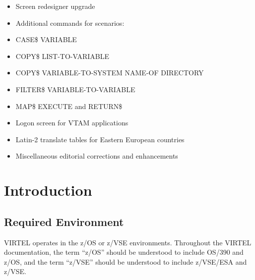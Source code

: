 \documentclass[letterpaper,10pt,english]{sphinxmanual}
\begin{document}
\begin{itemize}
\item {} 
Screen redesigner upgrade

\item {} 
Additional commands for scenarios:

\item {} 
CASE\$ VARIABLE

\item {} 
COPY\$ LIST-TO-VARIABLE

\item {} 
COPY\$ VARIABLE-TO-SYSTEM NAME-OF DIRECTORY

\item {} 
FILTER\$ VARIABLE-TO-VARIABLE

\item {} 
MAP\$ EXECUTE and RETURN\$

\end{itemize}

\begin{itemize}
\item {} 
Logon screen for VTAM applications

\item {} 
Latin-2 translate tables for Eastern European countries

\item {} 
Miscellaneous editorial corrections and enhancements

\end{itemize}


\chapter{Introduction}
\label{\detokenize{Installation_Guide:introduction}}\label{\detokenize{Installation_Guide:vvrrig58-introduction}}
\ignorespaces 

\section{Required Environment}
\label{\detokenize{Installation_Guide:required-environment}}\label{\detokenize{Installation_Guide:index-0}}
VIRTEL operates in the z/OS or z/VSE environments. Throughout the VIRTEL documentation, the term “z/OS” should be understood to include OS/390 and z/OS, and the term “z/VSE” should be understood to include z/VSE/ESA and z/VSE.
\end{document}
